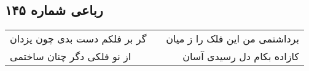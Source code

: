 \begin{center}
\section*{رباعی شماره ۱۴۵}
\label{sec:sh145}
\begin{longtable}{l p{0.5cm} r}
گر بر فلکم دست بدی چون یزدان
&&
برداشتمی من این فلک را ز میان
\\
از نو فلکی دگر چنان ساختمی
&&
کازاده بکام دل رسیدی آسان
\\
\end{longtable}
\end{center}

